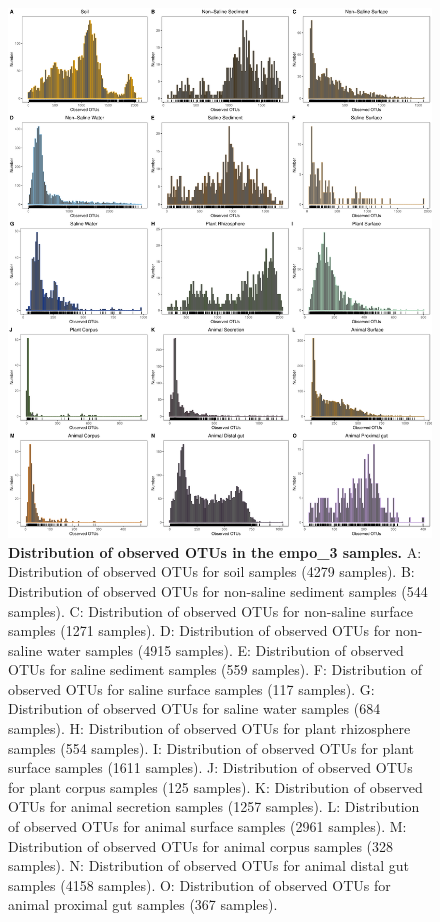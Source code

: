 \begin{figure}[H]
    \centering
    \includegraphics[scale=0.33]{./Figures/OO_hist_empo3}
    \caption{\textbf{Distribution of observed OTUs in the empo\_3 samples.} A: Distribution of observed OTUs for soil samples (4279 samples). B: Distribution of observed OTUs for non-saline sediment samples (544 samples). C: Distribution of observed OTUs for non-saline surface samples (1271 samples). D: Distribution of observed OTUs for non-saline water samples (4915 samples). E: Distribution of observed OTUs for saline sediment samples (559 samples). F: Distribution of observed OTUs for saline surface samples (117 samples). G: Distribution of observed OTUs for saline water samples (684 samples). H: Distribution of observed OTUs for plant rhizosphere samples (554 samples). I: Distribution of observed OTUs for plant surface samples (1611 samples). J: Distribution of observed OTUs for plant corpus samples (125 samples). K: Distribution of observed OTUs for animal secretion samples (1257 samples). L: Distribution of observed OTUs for animal surface samples (2961 samples). M: Distribution of observed OTUs for animal corpus samples (328 samples). N: Distribution of observed OTUs for animal distal gut samples (4158 samples). O: Distribution of observed OTUs for animal proximal gut samples (367 samples).}
    \label{fig:OO_hist3}
\end{figure}

